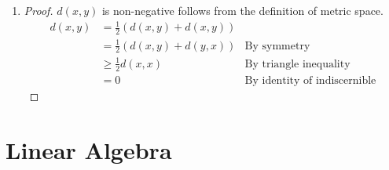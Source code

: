 \documentclass[paper=a4, fontsize=11pt]{scrartcl} %
\numberwithin{equation}{section} %
\numberwithin{figure}{section} %
\numberwithin{table}{section} %
\begin{document}
\begin{enumerate}
	\item
		\begin{proof}
			$d(x, y)$ is non-negative follows from the definition of metric space.
			\begin{equation}
				\begin{aligned}
					d(x, y) & = \frac{1}{2}(d(x, y) + d(x, y)) \\
							& = \frac{1}{2}(d(x, y) + d(y, x)) &\text{By symmetry}\\
							& \geq \frac{1}{2} d(x, x)         &\text{By triangle inequality} \\
							& = 0                              &\text{By identity of indiscernible}
				\end{aligned}
			\end{equation}
			

		\end{proof}
\end{enumerate}


\section{Linear Algebra}
\end{document}
